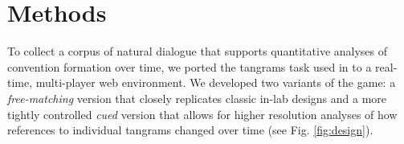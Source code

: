 \documentclass[alpha-refs]{wiley-article}
\begin{document}


\section{Methods}

To collect a corpus of natural dialogue that supports quantitative analyses of convention formation over time, we ported the tangrams task used in \cite{clarkReferringCollaborativeProcess1986} to a real-time, multi-player web environment. 
We developed two variants of the game: a \emph{free-matching} version that closely replicates classic in-lab designs and a more tightly controlled \emph{cued} version that allows for higher resolution analyses of how references to individual tangrams changed over time (see Fig. \ref{fig:design}). 
\end{document}
